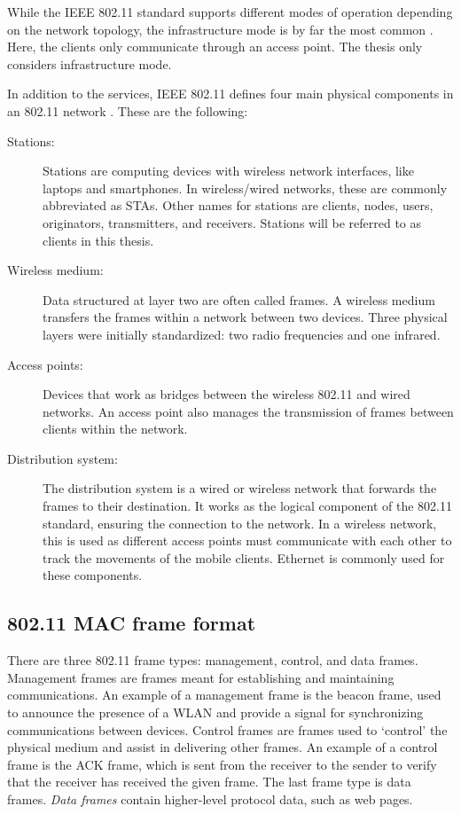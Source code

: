 While the IEEE 802.11 standard supports different modes of operation depending on the network topology, the infrastructure mode is by far the most common \cite{brzuska2017modular}. Here, the clients only communicate through an access point. The thesis only considers infrastructure mode.

In addition to the services, IEEE 802.11 defines four main physical components in an 802.11 network \cite{abdelalim2019study, gast2006802}. These are the following:

\begin{description}
\item[Stations:] Stations are computing devices with wireless network interfaces, like laptops and smartphones. In wireless/wired networks, these are commonly abbreviated as STAs. Other names for stations are clients, nodes, users, originators, transmitters, and receivers. Stations will be referred to as clients in this thesis.

\item[Wireless medium:] Data structured at layer two are often called frames. A wireless medium transfers the frames within a network between two devices. Three physical layers were initially standardized: two radio frequencies and one infrared.

\item[Access points:] Devices that work as bridges between the wireless 802.11 and wired networks. An access point also manages the transmission of frames between clients within the network.

\item[Distribution system:] The distribution system is a wired or wireless network that forwards the frames to their destination. It works as the logical component of the 802.11 standard, ensuring the connection to the network. In a wireless network, this is used as different access points must communicate with each other to track the movements of the mobile clients. Ethernet is commonly used for these components.
\end{description}

\subsection{802.11 MAC frame format\label{subsec:mac-back}}

There are three 802.11 frame types: management, control, and data frames. Management frames are frames meant for establishing and maintaining communications. An example of a management frame is the beacon frame, used to announce the presence of a WLAN and provide a signal for synchronizing communications between devices. Control frames are frames used to `control' the physical medium and assist in delivering other frames. An example of a control frame is the ACK frame, which is sent from the receiver to the sender to verify that the receiver has received the given frame. The last frame type is data frames. \textit{Data frames} contain higher-level protocol data, such as web pages.

